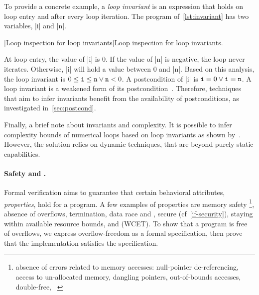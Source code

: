 To provide a concrete example, a \emph{loop invariant} is an expression that holds on loop entry and after every loop iteration.
The program of~\autoref{lst:invariant} has two variables, \pr|i| and \pr|n|.

\begin{center}
\begin{minipage}{\textwidth}
\captionsetup{type=lstlisting}
[Loop inspection for loop invariants]{Loop inspection for loop invariants.}
\label{lst:invariant}
\end{minipage}
\end{center}

At loop entry, the value of \pr|i| is 0.
If the value of \pr|n| is negative, the loop never iterates.
Otherwise, \pr|i| will hold a value between 0 and \pr|n|.
Based on this analysis, the loop invariant is \(0 \leq \prm{i} \leq \prm{n} \vee \prm{n} < 0\).
A postcondition of \pr|i| is \(\prm{i}=0 \vee \prm{i}=\prm{n}\).
A loop invariant is a {weakened} form of its postcondition~\cite{furia2010}.
Therefore, techniques that aim to infer invariants benefit from the availability of postconditions, as investigated in~\autoref{sec:postcond}.

Finally, a brief note about invariants and complexity.
It is possible to infer complexity bounds of numerical loops based on loop invariants as shown by~\textcite{nguyen2017}.
However, the solution relies on dynamic techniques, that are beyond purely static capabilities.

\paragraph*{Safety and .}
Formal verification aims to guarantee that certain behavioral attributes, \ie \emph{properties}, hold for a program.
A few examples of properties are memory safety%
\footnote{\Ie absence of errors related to memory accesses: null-pointer de-referencing, access to un-allocated memory, dangling pointers, out-of-bounds accesses, double-free, \etc~\cite{muller2024}},
absence of overflows, termination, data race and , secure  (cf~\autoref{if-security}), staying within available resource bounds, and  (WCET).
To show that a program is free of \eg overflows, we express {overflow-freedom} as a formal specification, then prove that the implementation satisfies the specification.

